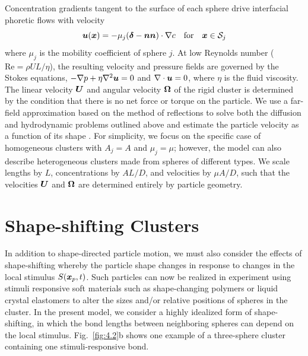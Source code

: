 Concentration gradients tangent to the surface of each sphere drive interfacial phoretic flows with velocity 
\begin{equation}
    \boldsymbol{u}(\boldsymbol{x})=-\mu_j (\boldsymbol{\delta}-\boldsymbol{n}\boldsymbol{n}) \cdot \nabla c\quad \text{for} \quad \boldsymbol{x}\in \mathcal{S}_j
\end{equation}
where  $\mu_j$ is the mobility coefficient of sphere $j$.  At low Reynolds number ($\text{Re}=\rho UL/\eta$), the resulting velocity and pressure fields are governed by the Stokes equations, $-\nabla p + \eta \nabla^2 \boldsymbol{u}=0$ and $\nabla \cdot \boldsymbol{u}=0$, where $\eta$ is the fluid viscosity.  The linear velocity $\boldsymbol{U}$ and angular velocity $\boldsymbol{\Omega}$ of the rigid cluster is determined by the condition that there is no net force or torque on the particle.  We use a far-field approximation based on the method of reflections \autocite{varma2018clustering} to solve both the diffusion and hydrodynamic problems outlined above and estimate the particle velocity as a function of its shape \autocite{Supp}. For simplicity, we focus on the specific case of homogeneous clusters with $A_j=A$ and $\mu_j=\mu$; however, the model can also describe heterogeneous clusters made from spheres of different types.  We scale lengths by $L$, concentrations by $A L/D$, and velocities by $\mu A/D$, such that the velocities $\boldsymbol{U}$ and $\boldsymbol{\Omega}$ are determined entirely by particle geometry.   

\section{Shape-shifting Clusters}  
In addition to shape-directed particle motion, we must also consider the effects of shape-shifting whereby the particle shape changes in response to changes in the local stimulus $S(\boldsymbol{x}_p,t)$.  Such particles can now be realized in experiment using stimuli responsive soft materials such as shape-changing polymers \autocite{magdanz2014stimuli} or liquid crystal elastomers \autocite{palagi2016structured} to alter the sizes and/or relative positions of spheres in the cluster.  In the present model, we consider a highly idealized form of shape-shifting, in which the bond lengths between neighboring spheres can depend on the local stimulus.  Fig.\ \ref{fig:4.2}b shows one example of a three-sphere cluster containing one stimuli-responsive bond.


